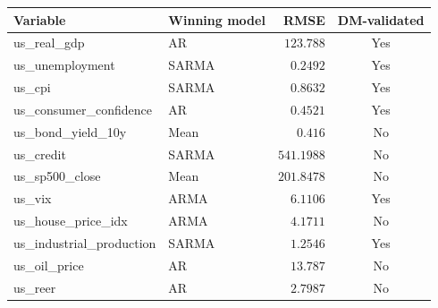 \begin{tabular}{llrc}
  \toprule
  Variable & Winning model & RMSE & DM-validated \\
  \midrule
  us\_real\_gdp & AR & $123.788$ & Yes \\
  us\_unemployment & SARMA & $0.2492$ & Yes \\
  us\_cpi & SARMA & $0.8632$ & Yes \\
  us\_consumer\_confidence & AR & $0.4521$ & Yes \\
  us\_bond\_yield\_10y & Mean & $0.416$ & No \\
  us\_credit & SARMA & $541.1988$ & No \\
  us\_sp500\_close & Mean & $201.8478$ & No \\
  us\_vix & ARMA & $6.1106$ & Yes \\
  us\_house\_price\_idx & ARMA & $4.1711$ & No \\
  us\_industrial\_production & SARMA & $1.2546$ & Yes \\
  us\_oil\_price & AR & $13.787$ & No \\
  us\_reer & AR & $2.7987$ & No \\
  \bottomrule
\end{tabular}